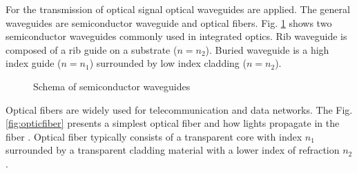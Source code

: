 For the transmission of optical signal optical waveguides are applied. The general waveguides are semiconductor waveguide and optical fibers. 
Fig. \ref{fig:semi_waveguides} shows two semiconductor waveguides commonly used in integrated optics. Rib waveguide is composed of a rib guide on a substrate ($n=n_{2}$). Buried waveguide is a high index guide ($n=n_{1}$) surrounded by low index cladding ($n=n_{2}$).\\

\begin{figure}
\centering
{}
\hfill
{}
\caption{Schema of semiconductor waveguides}
\label{fig:semi_waveguides}
\end{figure}
Optical fibers are widely used for telecommunication and data networks. The Fig.\ref{fig:opticfiber} presents a simplest optical fiber and how lights propagate in the fiber . Optical fiber typically consists of a transparent core with index $n_{1}$ surrounded by a transparent cladding material with a lower index of refraction $n_{2}$.\\
 
